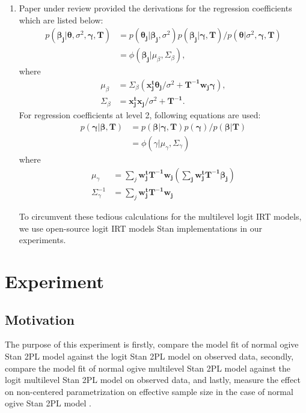 \documentclass[12pt]{article}
\begin{document}
\begin{enumerate}
    \item Paper under review \cite{fox2001bayesian} provided the derivations for the regression coefficients which are listed below:
    \begin{align*}
        p(\boldsymbol{\beta_j|\theta,} \sigma^2, \boldsymbol{\gamma, T}) & = 
        p(\boldsymbol{\theta_j|\beta_j}, \sigma^2)p(\boldsymbol{\beta_j|\gamma, T})/p(\boldsymbol{\theta}|\sigma^2,\boldsymbol{\gamma, T})\\
        & = \phi(\boldsymbol{\beta_j}|\mu_\beta, \Sigma_\beta),
    \end{align*} where
    \begin{align*}
        \mu_\beta & = \Sigma_\beta(\boldsymbol{x_j^t\theta_j}/\sigma^2 + \boldsymbol{T^{-1}w_j\gamma}),\\
        \Sigma_\beta & = \boldsymbol{x_j^tx_j}/\sigma^2 + \boldsymbol{T^{-1}}.
    \end{align*}
    For regression coefficients at level 2, following equations are used:
    \begin{align*}
        p(\boldsymbol{\gamma|\beta, T}) & = 
        p(\boldsymbol{\beta|\gamma, T})p(\boldsymbol{\gamma})/p(\boldsymbol{\beta|T})\\
        & = \phi(\gamma|\mu_\gamma, \Sigma_\gamma)
    \end{align*} where
    \begin{align*}
        \mu_\gamma & = \sum_j \boldsymbol{w^t_jT^{-1}w_j(\sum_j \boldsymbol{w^t_jT^{-1}\beta_j})}\\
        \Sigma^{-1}_\gamma & = \sum_j \boldsymbol{w^t_jT^{-1}w_j}
    \end{align*}
    
    
To circumvent these tedious calculations for the multilevel logit IRT models, we use open-source logit IRT models Stan implementations in our experiments.
\end{enumerate} 

\section{Experiment}
\subsection{Motivation}
The purpose of this experiment is firstly, compare the model fit of normal ogive Stan 2PL model against the logit Stan 2PL model on observed data, secondly, compare the model fit of normal ogive multilevel Stan 2PL model against the logit multilevel Stan 2PL model on observed data, and lastly, measure the effect on non-centered parametrization on effective sample size in the case of normal ogive Stan 2PL model \cite{papaspiliopoulos2007general}. 
\end{document}
